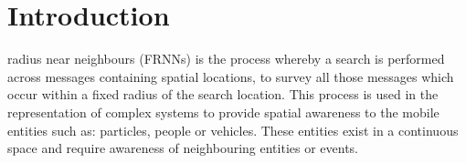 \section{Introduction}  
  
  
   radius near neighbours (FRNNs) is the process whereby a search is performed across messages containing spatial locations, to survey all those messages which occur within a fixed radius of the search location. This process is used in the representation of complex systems to provide spatial awareness to the mobile entities such as: particles, people or vehicles. These entities exist in a continuous space and require awareness of neighbouring entities or events.
  
